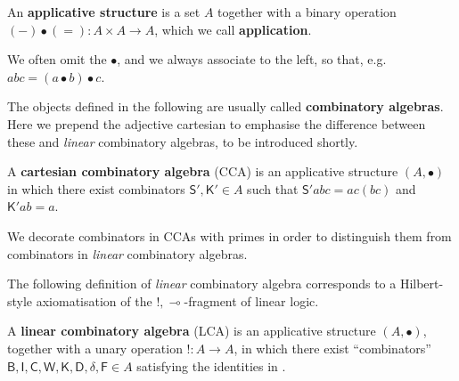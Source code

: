 \documentclass[a4paper,UKenglish,cleveref,numberwithinsect, autoref, thm-restate]{lipics-v2021}
\newcommand{\B}{\mathsf{B}}
\newcommand{\I}{\mathsf{I}}
\newcommand{\C}{\mathsf{C}}
\newcommand{\W}{\mathsf{W}}
\newcommand{\K}{\mathsf{K}}
\newcommand{\D}{\mathsf{D}}
\newcommand{\F}{\mathsf{F}}
\newcommand{\Scom}{\mathsf{S}}
\newcommand{\lin}{\multimap}
\begin{document}
\begin{definition}
    An \textbf{applicative structure} is a set $A$ together with a binary operation $(-)\bullet(=):A\times A \rightarrow A$,
    which we call \textbf{application}.
\end{definition}
We often omit the $\bullet$, and we always associate to the left, so that, e.g. $abc = (a\bullet b)\bullet c$.

The objects defined in the following are usually called \textbf{combinatory algebras}. Here we prepend the adjective cartesian to emphasise the difference between these and \textit{linear} combinatory algebras, to be introduced shortly.
\begin{definition}
    A \textbf{cartesian combinatory algebra} (CCA) is an applicative structure $(A,\bullet)$ in which there exist combinators $\Scom',\K'\in A$
    such that $\Scom' a b c = ac(bc)$ and $\K' a b = a$.
\end{definition}
We decorate combinators in CCAs with primes in order to distinguish them from combinators in \textit{linear} combinatory algebras.

The following definition of \textit{linear} combinatory algebra \cite{AbramskyHaghverdiScott2002LCAs} corresponds to a Hilbert-style axiomatisation of the $!,\lin$-fragment of linear logic.
\begin{definition}
    A \textbf{linear combinatory algebra} (LCA) is an applicative structure $(A,\bullet)$, together with a unary operation $!:A\rightarrow A$, in which there exist ``combinators''
    $\B,\I,\C,\W,\K,\D,\delta,\F\in A$
    satisfying the identities in .
\end{definition}
\end{document}
